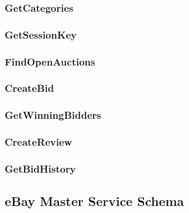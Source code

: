 \documentclass[12pt,a4paper]{article}
\begin{document}
\subsubsection{GetCategories}
\subsubsection{GetSessionKey}
\subsubsection{FindOpenAuctions}
\subsubsection{CreateBid}
\subsubsection{GetWinningBidders}
\subsubsection{CreateReview}
\subsubsection{GetBidHistory}


\subsection{eBay Master Service Schema}
\end{document}
